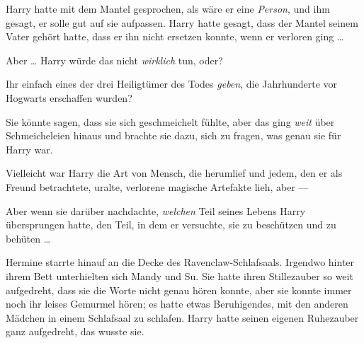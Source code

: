 Harry hatte mit dem Mantel gesprochen, als wäre er eine \emph{Person}, und ihm gesagt, er solle gut auf sie aufpassen. Harry hatte gesagt, dass der Mantel seinem Vater gehört hatte, dass er ihn nicht ersetzen konnte, wenn er verloren ging …

Aber … Harry würde das nicht \emph{wirklich} tun, oder?

Ihr einfach eines der drei Heiligtümer des Todes \emph{geben}, die Jahrhunderte vor Hogwarts erschaffen wurden?

Sie könnte sagen, dass sie sich geschmeichelt fühlte, aber das ging \emph{weit} über Schmeicheleien hinaus und brachte sie dazu, sich zu fragen, was genau sie für Harry war.

Vielleicht war Harry die Art von Mensch, die herumlief und jedem, den er als Freund betrachtete, uralte, verlorene magische Artefakte lieh, aber —

Aber wenn sie darüber nachdachte, \emph{welchen} Teil seines Lebens Harry übersprungen hatte, den Teil, in dem er versuchte, sie zu beschützen und zu behüten …

Hermine starrte hinauf an die Decke des Ravenclaw-Schlafsaals. Irgendwo hinter ihrem Bett unterhielten sich Mandy und Su. Sie hatte ihren Stillezauber so weit aufgedreht, dass sie die Worte nicht genau hören konnte, aber sie konnte immer noch ihr leises Gemurmel hören; es hatte etwas Beruhigendes, mit den anderen Mädchen in einem Schlafsaal zu schlafen. Harry hatte seinen eigenen Ruhezauber ganz aufgedreht, das wusste sie.

